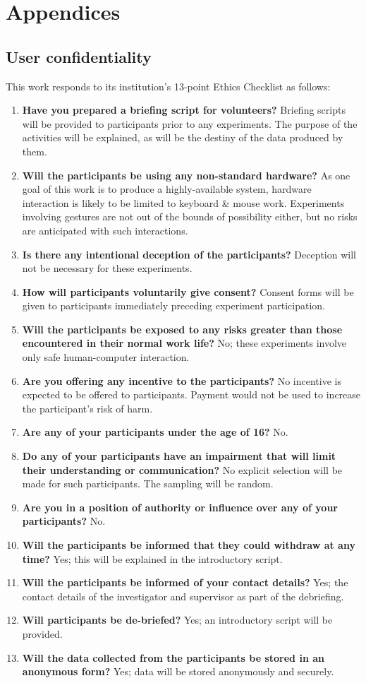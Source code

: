 \documentclass[a4paper, 11pt]{article}
\begin{document}
\pagebreak
\printbibliography

\pagebreak
\section{Appendices}
\subsection{User confidentiality}
This work responds to its institution's 13-point Ethics Checklist as follows:

\newcommand{\ethitem}[2]{\item {\bfseries #1} #2}
\begin{enumerate}
\ethitem{Have you prepared a briefing script for volunteers?}{Briefing scripts will be provided to participants prior to any experiments. The purpose of the activities will be explained, as will be the destiny of the data produced by them.}
\ethitem{Will the participants be using any non-standard hardware?}{As one goal of this work is to produce a highly-available system, hardware interaction is likely to be limited to keyboard \& mouse work. Experiments involving gestures are not out of the bounds of possibility either, but no risks are anticipated with such interactions.}
\ethitem{Is there any intentional deception of the participants?}{Deception will not be necessary for these experiments.}
\ethitem{How will participants voluntarily give consent?}{Consent forms will be given to participants immediately preceding experiment participation.}
\ethitem{Will the participants be exposed to any risks greater than those encountered in their normal work life?}{No; these experiments involve only safe human-computer interaction.}
\ethitem{Are you offering any incentive to the participants?}{No incentive is expected to be offered to participants. Payment would not be used to increase the participant's risk of harm.}
\ethitem{Are any of your participants under the age of 16?}{No.}
\ethitem{Do any of your participants have an impairment that will limit their understanding or communication?}{No explicit selection will be made for such participants. The sampling will be random.}
\ethitem{Are you in a position of authority or influence over any of your participants?}{No.}
\ethitem{Will the participants be informed that they could withdraw at any time?}{Yes; this will be explained in the introductory script.}
\ethitem{Will the participants be informed of your contact details?}{Yes; the contact details of the investigator and supervisor as part of the debriefing.}
\ethitem{Will participants be de-briefed?}{Yes; an introductory script will be provided.}
\ethitem{Will the data collected from the participants be stored in an anonymous form?}{Yes; data will be stored anonymously and securely.}
\end{enumerate}
\end{document}
